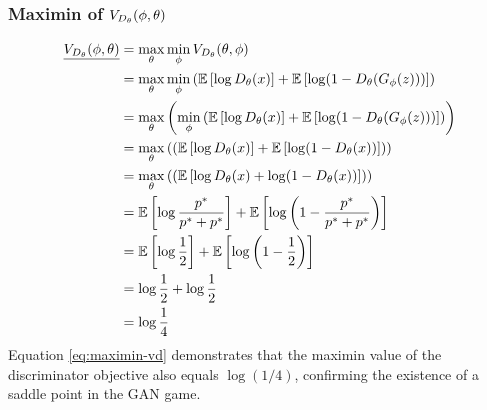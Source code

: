 \subsubsection{Maximin of $V_{D_\theta}(\phi, \theta)$}
\label{sec:maximin-vd}
\begin{align}
	\underline{V_{D_\theta}(\phi, \theta)} & = \max_{\theta}\min_{\phi} V_{D_\theta}(\theta, \phi) \nonumber                                                                                         \\
	                & = \max_{\theta}\min_{\phi} \left( \mathbb{E}\left[\log{D_\theta(x)}\right] + \mathbb{E}\left[\log(1 - D_\theta(G_\phi(z)))\right] \right) \nonumber               \\
	                & = \max_{\theta}\left(\min_{\phi} \left( \mathbb{E}\left[\log{D_\theta(x)}\right] + \mathbb{E}\left[\log(1 - D_\theta(G_\phi(z)))\right] \right) \right) \nonumber \\
	                & = \max_{\theta}\left(\left( \mathbb{E}\left[\log{D_\theta(x)}\right] + \mathbb{E}\left[\log(1 - D_\theta(x))\right] \right) \right) \nonumber                 \\
	                & = \max_{\theta}\left(\left( \mathbb{E}\left[\log{D_\theta(x)} + \log(1 - D_\theta(x))\right] \right) \right) \nonumber                                        \\
	                & = \mathbb{E}\left[\log\frac{p^*}{p^* + p^*}\right] + \mathbb{E}\left[\log\left(1 - \frac{p^*}{p^* + p^*}\right)\right] \nonumber                  \\
	                & = \mathbb{E}\left[\log\frac{1}{2}\right] + \mathbb{E}\left[\log{\left(1 - \frac{1}{2}\right)}\right] \nonumber                                    \\
	                & = \log\frac{1}{2} + \log\frac{1}{2} \nonumber                                                                                                     \\
	                & = \log\frac{1}{4} \label{eq:maximin-vd}
\end{align}
Equation \ref{eq:maximin-vd} demonstrates that the maximin value of the
discriminator objective also equals $\log(1/4)$, confirming the existence of a
saddle point in the GAN game.
